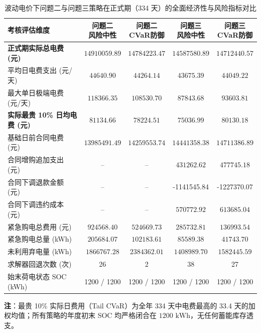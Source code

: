\documentclass[withoutpreface]{cumcmthesis}
\begin{document}
\begin{table}[htbp]
\centering
\small %
\renewcommand{\arraystretch}{1.2}
\setlength{\tabcolsep}{3.5pt} %
\caption{波动电价下问题二与问题三策略在正式期（334 天）的全面经济性与风险指标对比}
\label{tab:q4_annual_comparison}
\begin{tabular*}{\textwidth}{@{\extracolsep{\fill}}lcccc@{}}
\toprule[1.5pt]
考核评估维度 & \shortstack{问题二\\风险中性} & \shortstack{问题二\\CVaR防御} & \shortstack{问题三\\风险中性} & \shortstack{问题三\\CVaR防御} \\
\midrule[1pt]
\textbf{正式期实际总电费 (元)} & $14910059.89$ & $\mathbf{14784223.47}$ & $\mathbf{14587580.89}$ & $14712440.57$ \\
平均日电费支出 (元/天)        & $44640.90$    & $44264.14$            & $43675.39$            & $44049.22$    \\
最大单日极端电费 (元/天)      & $118366.35$   & $\mathbf{108530.70}$   & $\mathbf{87843.68}$   & $93603.81$    \\
\textbf{实际最贵 10\% 日均电费 (元)} & $81134.66$ & $\mathbf{78224.51}$   & $\mathbf{75036.99}$   & $80130.18$    \\
\midrule[0.5pt]
基础日前合同电费 (元)        & $13985491.49$ & $14259553.74$          & $14441358.38$          & $14711386.89$ \\
合同增购追加支出 (元)        & --            & --                     & $431262.62$           & $477745.18$   \\
合同下调退款金额 (元)        & --            & --                     & -1141545.84           & -1227370.07   \\
合同下调违约成本 (元)        & --            & --                     & $570772.92$           & $613685.04$   \\
紧急购电总费用 (元)          & $924568.40$   & $\mathbf{524669.73}$   & $285732.81$           & $\mathbf{136993.54}$ \\
紧急购电总量 (kWh)           & $205684.07$   & $\mathbf{102183.61}$   & $85589.38$            & $\mathbf{41743.70}$  \\
未利用弃电量 (kWh)           & $1866767.28$  & $2384362.01$           & $1408989.70$          & $1582445.59$  \\
求解器回退次数 (次)          & 26            & 2                      & 38                    & 27            \\
始末荷电状态 SOC (kWh)       & 1200 / 1200   & 1200 / 1200            & 1200 / 1200           & 1200 / 1200   \\
\bottomrule[1.5pt]
\end{tabular*}
\begin{tablenotes}
    \footnotesize
    \item \textbf{注}：最贵 10\% 实际日费用（Tail CVaR）为全年 334 天中电费最高的 33.4 天的加权均值；所有策略的年度初末 SOC 均严格闭合在 $1200\text{ kWh}$，无任何蓄能库存透支。
\end{tablenotes}
\end{table}
\end{document}
